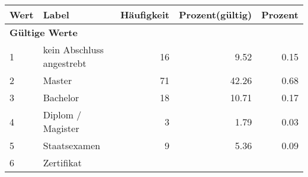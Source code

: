      \begin{longtable}{lXrrr}
     \toprule
     \textbf{Wert} & \textbf{Label} & \textbf{Häufigkeit} & \textbf{Prozent(gültig)} & \textbf{Prozent} \\
     \endhead
     \midrule
     \multicolumn{5}{l}{\textbf{Gültige Werte}}\\

     1 &
     \multicolumn{1}{X}{ kein Abschluss angestrebt   } &


       \num{16} &
       \num[round-mode=places,round-precision=2]{9,52} &
         \num[round-mode=places,round-precision=2]{0,15} \\

     2 &
     \multicolumn{1}{X}{ Master   } &


       \num{71} &
       \num[round-mode=places,round-precision=2]{42,26} &
         \num[round-mode=places,round-precision=2]{0,68} \\

     3 &
     \multicolumn{1}{X}{ Bachelor   } &


       \num{18} &
       \num[round-mode=places,round-precision=2]{10,71} &
         \num[round-mode=places,round-precision=2]{0,17} \\

     4 &
     \multicolumn{1}{X}{ Diplom / Magister   } &


       \num{3} &
       \num[round-mode=places,round-precision=2]{1,79} &
         \num[round-mode=places,round-precision=2]{0,03} \\

     5 &
     \multicolumn{1}{X}{ Staatsexamen   } &


       \num{9} &
       \num[round-mode=places,round-precision=2]{5,36} &
         \num[round-mode=places,round-precision=2]{0,09} \\

     6 &
     \multicolumn{1}{X}{ Zertifikat   } &



\end{longtable}
